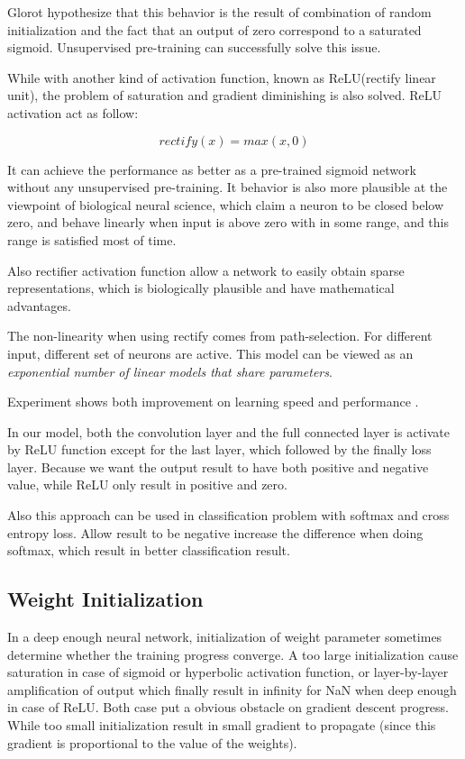 \documentclass[10pt,twocolumn,letterpaper]{article}
\begin{document}
Glorot hypothesize that this behavior is the result of combination of random initialization
and the fact that an output of zero correspond to a saturated sigmoid. Unsupervised pre-training
can successfully solve this issue.

While with another kind of activation function, known as ReLU(rectify linear unit), the problem
of saturation and gradient diminishing is also solved. ReLU activation act as follow:

$$
rectify(x) = max(x, 0)
$$

It can achieve the performance as better
as a pre-trained sigmoid network\cite{glorot2011deep} without any unsupervised pre-training.
It behavior is also more plausible at the viewpoint of biological neural science, which claim
a neuron to be closed below zero, and behave linearly when input is above zero with in some range,
and this range is satisfied most of time.

Also rectifier activation function allow a network to easily obtain sparse representations, which
is biologically plausible and have mathematical advantages.

The non-linearity when using rectify comes from path-selection. For different input, different
set of neurons are active. This model can be viewed as an \emph{exponential
number of linear models that share parameters}\cite{nair2010rectified}.

Experiment shows both improvement on learning speed and performance
\cite{krizhevsky2012imagenet, glorot2011deep}.

In our model, both the convolution layer and the full connected layer is activate by ReLU function
except for the last layer, which followed by the finally loss layer. Because we want the output
result to have both positive and negative value, while ReLU only result in positive and zero.

Also this approach can be used in classification problem with softmax and cross entropy loss.
Allow result to be negative increase the difference when doing softmax, which result in better
classification result.

\subsection{Weight Initialization}
In a deep enough neural network, initialization of weight parameter sometimes determine whether the
training progress converge. A too large initialization cause saturation in case of sigmoid or hyperbolic
activation function, or layer-by-layer amplification of output which finally result in
infinity for NaN when deep enough in case of ReLU. Both case put a obvious obstacle on gradient
descent progress. While too small initialization result in small gradient to propagate
(since this gradient is proportional to the value of the weights).
\end{document}
